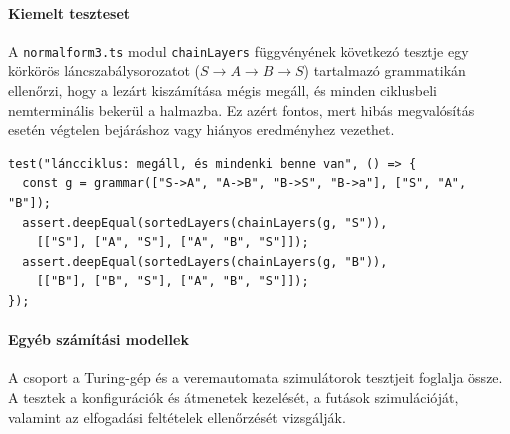 \newpage
\paragraph{Kiemelt teszteset} A \texttt{normalform3.ts} modul \texttt{chainLayers} függvényének következó tesztje egy körkörös láncszabálysorozatot ($S \to A \to B \to S$) tartalmazó grammatikán ellenőrzi, hogy a lezárt kiszámítása mégis megáll, és minden ciklusbeli nemterminális bekerül a halmazba. Ez azért fontos, mert hibás megvalósítás esetén végtelen bejáráshoz vagy hiányos eredményhez vezethet.
\begin{lstlisting}
test("láncciklus: megáll, és mindenki benne van", () => {
  const g = grammar(["S->A", "A->B", "B->S", "B->a"], ["S", "A", "B"]);
  assert.deepEqual(sortedLayers(chainLayers(g, "S")),
    [["S"], ["A", "S"], ["A", "B", "S"]]);
  assert.deepEqual(sortedLayers(chainLayers(g, "B")),
    [["B"], ["B", "S"], ["A", "B", "S"]]);
});
\end{lstlisting}

\paragraph{Egyéb számítási modellek}
A csoport a Turing-gép és a veremautomata szimulátorok tesztjeit foglalja össze. A tesztek a konfigurációk és átmenetek kezelését, a futások szimulációját, valamint az elfogadási feltételek ellenőrzését vizsgálják.

